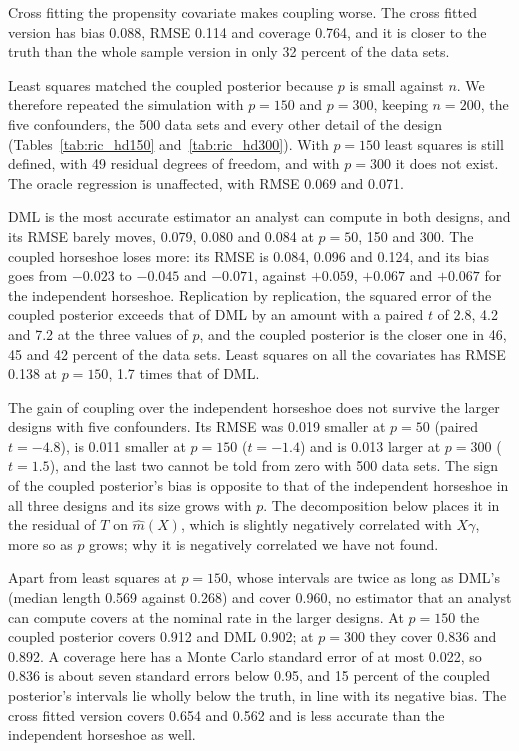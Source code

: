 Cross fitting the propensity covariate makes coupling worse. The cross fitted version has bias 0.088, RMSE 0.114 and coverage 0.764, and it is closer to the truth than the whole sample version in only 32 percent of the data sets. 

Least squares matched the coupled posterior because $p$ is small against $n$. We therefore repeated the simulation with $p = 150$ and $p = 300$, keeping $n = 200$, the five confounders, the 500 data sets and every other detail of the design (Tables~\ref{tab:ric_hd150} and~\ref{tab:ric_hd300}). With $p = 150$ least squares is still defined, with 49 residual degrees of freedom, and with $p = 300$ it does not exist. The oracle regression is unaffected, with RMSE 0.069 and 0.071.





DML is the most accurate estimator an analyst can compute in both designs, and its RMSE barely moves, 0.079, 0.080 and 0.084 at $p = 50$, 150 and 300. The coupled horseshoe loses more: its RMSE is 0.084, 0.096 and 0.124, and its bias goes from $-0.023$ to $-0.045$ and $-0.071$, against $+0.059$, $+0.067$ and $+0.067$ for the independent horseshoe. Replication by replication, the squared error of the coupled posterior exceeds that of DML by an amount with a paired $t$ of 2.8, 4.2 and 7.2 at the three values of $p$, and the coupled posterior is the closer one in 46, 45 and 42 percent of the data sets. Least squares on all the covariates has RMSE 0.138 at $p = 150$, 1.7 times that of DML.

The gain of coupling over the independent horseshoe does not survive the larger designs with five confounders. Its RMSE was 0.019 smaller at $p = 50$ (paired $t = -4.8$), is 0.011 smaller at $p = 150$ ($t = -1.4$) and is 0.013 larger at $p = 300$ ($t = 1.5$), and the last two cannot be told from zero with 500 data sets. The sign of the coupled posterior's bias is opposite to that of the independent horseshoe in all three designs and its size grows with $p$. The decomposition below places it in the residual of $T$ on $\hat m(X)$, which is slightly negatively correlated with $X\gamma$, more so as $p$ grows; why it is negatively correlated we have not found.

Apart from least squares at $p = 150$, whose intervals are twice as long as DML's (median length 0.569 against 0.268) and cover 0.960, no estimator that an analyst can compute covers at the nominal rate in the larger designs. At $p = 150$ the coupled posterior covers 0.912 and DML 0.902; at $p = 300$ they cover 0.836 and 0.892. A coverage here has a Monte Carlo standard error of at most 0.022, so 0.836 is about seven standard errors below 0.95, and 15 percent of the coupled posterior's intervals lie wholly below the truth, in line with its negative bias. The cross fitted version covers 0.654 and 0.562 and is less accurate than the independent horseshoe as well.

